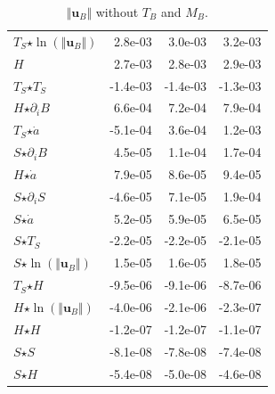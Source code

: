 \begin{table}[H]
\begin{tabular}{l|r|r|r}
  $T_S$$ \star $$\ln\left( \Vert \mathbf{u}_B \Vert \right)$ & 2.8e-03 & 3.0e-03 & 3.2e-03 \\
  $H$ & 2.7e-03 & 2.8e-03 & 2.9e-03 \\
  $T_S$$ \star $$T_S$ & -1.4e-03 & -1.4e-03 & -1.3e-03 \\
  $H$$ \star $$\partial_i B$ & 6.6e-04 & 7.2e-04 & 7.9e-04 \\
  \color{red}$T_S$$ \star $$\dot{a}$ & \color{red}-5.1e-04 & \color{red}3.6e-04 & \color{red}1.2e-03 \\
  $S$$ \star $$\partial_i B$ & 4.5e-05 & 1.1e-04 & 1.7e-04 \\
  $H$$ \star $$\dot{a}$ & 7.9e-05 & 8.6e-05 & 9.4e-05 \\
  \color{red}$S$$ \star $$\partial_i S$ & \color{red}-4.6e-05 & \color{red}7.1e-05 & \color{red}1.9e-04 \\
  $S$$ \star $$\dot{a}$ & 5.2e-05 & 5.9e-05 & 6.5e-05 \\
  $S$$ \star $$T_S$ & -2.2e-05 & -2.2e-05 & -2.1e-05 \\
  $S$$ \star $$\ln\left( \Vert \mathbf{u}_B \Vert \right)$ & 1.5e-05 & 1.6e-05 & 1.8e-05 \\
  $T_S$$ \star $$H$ & -9.5e-06 & -9.1e-06 & -8.7e-06 \\
  $H$$ \star $$\ln\left( \Vert \mathbf{u}_B \Vert \right)$ & -4.0e-06 & -2.1e-06 & -2.3e-07 \\
  $H$$ \star $$H$ & -1.2e-07 & -1.2e-07 & -1.1e-07 \\
  $S$$ \star $$S$ & -8.1e-08 & -7.8e-08 & -7.4e-08 \\
  $S$$ \star $$H$ & -5.4e-08 & -5.0e-08 & -4.6e-08 \\
\end{tabular}
  \caption[]{\normalsize $\Vert \mathbf{u}_B \Vert$ without $T_B$ and $M_B$.}
\end{table}


